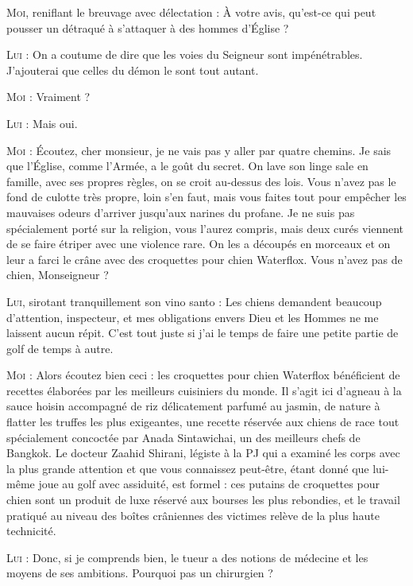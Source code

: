 \begin{dialogue}

\textsc{Moi}, reniflant le breuvage avec délectation : À votre avis, qu’est-ce qui peut pousser un détraqué à s’attaquer à des hommes d’Église ?

\textsc{Lui} : On a coutume de dire que les voies du Seigneur sont impénétrables. J’ajouterai que celles du démon le sont tout autant.

\textsc{Moi} : Vraiment ?

\textsc{Lui} : Mais oui.

\textsc{Moi} : Écoutez, cher monsieur, je ne vais pas y aller par quatre chemins. Je sais que l’Église, comme l’Armée, a le goût du secret. On lave son linge sale en famille, avec ses propres règles, on se croit au-dessus des lois. Vous n’avez pas le fond de culotte très propre, loin s’en faut, mais vous faites tout pour empêcher les mauvaises odeurs d’arriver jusqu’aux narines du profane. Je ne suis pas spécialement porté sur la religion, vous l’aurez compris, mais deux curés viennent de se faire étriper avec une violence rare. On les a découpés en morceaux et on leur a farci le crâne avec des croquettes pour chien Waterflox. Vous n’avez pas de chien, Monseigneur ?

\textsc{Lui}, sirotant tranquillement son vino santo : Les chiens demandent beaucoup d’attention, inspecteur, et mes obligations envers Dieu et les Hommes ne me laissent aucun répit. C’est tout juste si j’ai le temps de faire une petite partie de golf de temps à autre.

\textsc{Moi} : Alors écoutez bien ceci : les croquettes pour chien Waterflox bénéficient de recettes élaborées par les meilleurs cuisiniers du monde. Il s’agit ici d’agneau à la sauce hoisin accompagné de riz délicatement parfumé au jasmin, de nature à flatter les truffes les plus exigeantes, une recette réservée aux chiens de race tout spécialement concoctée par Anada Sintawichai, un des meilleurs chefs de Bangkok. Le docteur Zaahid Shirani, légiste à la PJ qui a examiné les corps avec la plus grande attention et que vous connaissez peut-être, étant donné que lui-même joue au golf avec assiduité, est formel : ces putains de croquettes pour chien sont un produit de luxe réservé aux bourses les plus rebondies, et le travail pratiqué au niveau des boîtes crâniennes des victimes relève de la plus haute technicité.

%
%
\textsc{Lui} : Donc, si je comprends bien, le tueur a des notions de médecine et les moyens de ses ambitions. Pourquoi pas un chirurgien ?


\end{dialogue}
